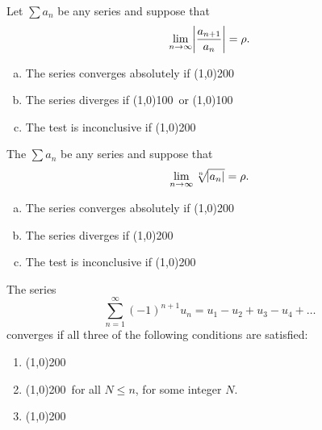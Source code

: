 \documentclass[12pt]{amsart}
\begin{document}
\begin{thm}
  Let \(\sum a_n\) be any series and suppose that
  \[\lim_{n \to \infty} \abs{\frac{a_{n+1}}{a_n}} = \rho.\]
  \vspace{.10in}
  \begin{enumerate}[(a)]
  \item
    The series converges absolutely if \line(1,0){200}
    \vspace{.10in}
  \item
    The series diverges if \line(1,0){100}\ or \line(1,0){100}
    \vspace{.10in}
  \item
    The test is inconclusive if \line(1,0){200}
  \end{enumerate}
\end{thm}

\begin{thm}
  The \(\sum a_n\) be any series and suppose that
  \[\lim_{n \to \infty} \sqrt[n]{\abs{a_n}} = \rho.\]
  \vspace{.10in}
  \begin{enumerate}[(a)]
  \item
    The series converges absolutely if \line(1,0){200}
    \vspace{.10in}
  \item
    The series diverges if \line(1,0){200}
    \vspace{.10in}
  \item
    The test is inconclusive if \line(1,0){200}
  \end{enumerate}
\end{thm}

\begin{thm}
  The series
  \[\sum_{n = 1}^\infty (-1)^{n+1} u_n = u_1 - u_2 + u_3 - u_4 + \ldots\]
  converges if all three of the following conditions are satisfied:
  \vspace{.10in}
  \begin{enumerate}
  \item
    \line(1,0){200}
    \vspace{.10in}
  \item
    \line(1,0){200}\ for all \(N \leq n\), for some integer \(N\).
    \vspace{.10in}
  \item
    \line(1,0){200}
  \end{enumerate}
\end{thm}
\end{document}
